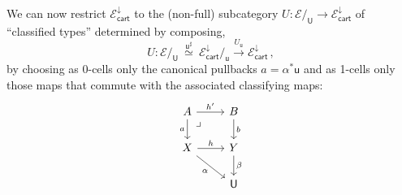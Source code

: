 \documentclass[12pt,reqno]{amsart}
\newcommand{\EE}{\ensuremath{\mathcal{E}}}
\newcommand{\hook}{\ensuremath{\hookrightarrow}}
\renewcommand{\to}{\ensuremath{\rightarrow}}
\newcommand{\too}{\ensuremath{\longrightarrow}}
\renewcommand{\t}{\ensuremath{\mathsf{u}}}
\newcommand{\T}{\ensuremath{\mathsf{U}}}
\newcommand{\TT}{\ensuremath{\dot{\mathsf{U}}}}
\newcommand{\pbcorner}{\arrow[dr,phantom,"\lrcorner" very near start, shift right=.5ex]} %
\newtheorem{proposition}[theorem]{Proposition}
\theoremstyle{remark}
\theoremstyle{definition}
\begin{document}
We can now restrict $\EE^{\downarrow}_{\mathsf{cart}}$ to the (non-full) subcategory $U : \EE/_\T \to \EE^{\downarrow}_{\mathsf{cart}}$ of ``classified types'' determined by composing,
\begin{equation}\label{eq:faithfulU}
U : \EE/_\T\ \stackrel{\t^{\sharp}}{\simeq}\ \EE^{\downarrow}_{\mathsf{cart}} /_\t \stackrel{U_\t}{\too} \EE^{\downarrow}_{\mathsf{cart}}\,,
\end{equation}
by choosing as 0-cells only the canonical  pullbacks $a = \alpha^{*}\t$ and as 1-cells only those maps that commute with the associated classifying maps:
\begin{equation}\label{diag:classified1cells}
\begin{tikzcd}
A \ar[d,swap, "a"] \ar[r, "{h'}"] \pbcorner & B \ar[d, "b"] \\
X \ar[r,swap,swap, "{h}"] \ar[rd,swap, "\alpha"] &  Y \ar[d, "\beta"]\\
& \T
\end{tikzcd}
\end{equation}
%
%
%
%
\end{document}
